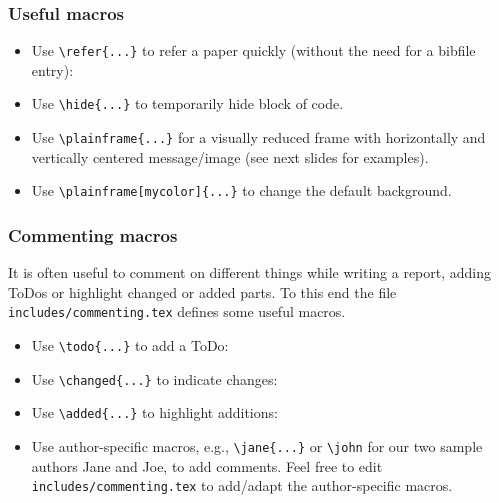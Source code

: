 \documentclass[t,english]{beamer}
\begin{document}
\begin{frame}[fragile]
  \frametitle{Useful macros}

  \begin{itemize}
    \item Use \verb|\refer{...}| to refer a paper quickly (without the need for a bibfile entry): 
    \item Use \verb|\hide{...}| to temporarily hide block of code.
    \item Use \verb|\plainframe{...}| for a visually reduced frame with horizontally and vertically centered message/image (see next slides for examples).
    \item Use \verb|\plainframe[mycolor]{...}| to change the default background.
  \end{itemize}

\end{frame}

\plainframe{\textcolor{rwth-blue-100}{Plain slide (focus on certain element)}}


\begin{frame}[fragile]
  \frametitle{Commenting macros}
    
  It is often useful to comment on different things while writing a report, adding ToDos or highlight changed or added parts. To this end the file \texttt{includes/commenting.tex} defines some useful macros.
  \begin{itemize}
    \item Use \verb|\todo{...}| to add a ToDo:\newline {}
    \item Use \verb|\changed{...}| to indicate changes:\newline {}
    \item Use \verb|\added{...}| to highlight additions:\newline {}
    \item Use author-specific macros, e.g., \verb|\jane{...}| or \verb|\john| for our two sample authors Jane and Joe, to add comments. Feel free to edit \texttt{includes/commenting.tex} to add/adapt the author-specific macros.\newline{}
    \newline
  \end{itemize}
    
\end{frame}
\end{document}

